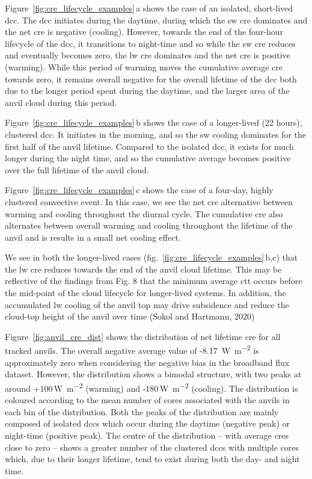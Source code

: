 Figure~\ref{fig:cre_lifecycle_examples}\,a shows the case of an isolated, short-lived \acrshort{dcc}. The \acrshort{dcc}
initiates during the daytime, during which the \acrshort{sw} \acrshort{cre} dominates and the
net \acrshort{cre} is negative (cooling). However, towards the end of the four-hour
lifecycle of the \acrshort{dcc}, it transitions to night-time and so while the \acrshort{sw}
\acrshort{cre} reduces and eventually becomes zero, the \acrshort{lw} \acrshort{cre} dominates and the
net \acrshort{cre} is positive (warming). While this period of warming moves the
cumulative average \acrshort{cre} towards zero, it remains overall negative for the
overall lifetime of the \acrshort{dcc} both due to the longer period spent during
the daytime, and the larger area of the anvil cloud during this period.

Figure~\ref{fig:cre_lifecycle_examples}\,b shows the case of a longer-lived (22 hours), clustered \acrshort{dcc}.
It initiates in the morning, and so the \acrshort{sw} cooling dominates for the
first half of the anvil lifetime. Compared to the isolated \acrshort{dcc}, it
exists for much longer during the night time, and so the cumulative
average becomes positive over the full lifetime of the anvil cloud.

Figure~\ref{fig:cre_lifecycle_examples}\,c shows the case of a four-day, highly clustered convective
event. In this case, we see the net \acrshort{cre} alternative between warming and
cooling throughout the diurnal cycle. The cumulative \acrshort{cre} also alternates
between overall warming and cooling throughout the lifetime of the anvil
and is results in a small net cooling effect.

We see in both the longer-lived cases (fig.~\ref{fig:cre_lifecycle_examples}\,b,c) that the \acrshort{lw}
\acrshort{cre} reduces towards the end of the anvil cloud lifetime. This may be
reflective of the findings from Fig. 8 that the minimum average \acrshort{ctt}
occurs before the mid-point of the cloud lifecycle for longer-lived
systems. In addition, the accumulated \acrshort{lw} cooling of the anvil top may
drive subsidence and reduce the cloud-top height of the anvil over time
(Sokol and Hartmann, 2020)

Figure~\ref{fig:anvil_cre_dist} shows the distribution of net lifetime \acrshort{cre} for all tracked
anvils. The overall negative average value of -8.17
\,\unit{W m^{-2}} is approximately zero when considering the
negative bias in the broadband flux dataset. However, the distribution
shows a bimodal structure, with two peaks at around
+100\,\unit{W m^{-2}} (warming) and -180\,\unit{W m^{-2}}
(cooling). The distribution is coloured according to the mean number of
cores associated with the anvils in each bin of the distribution. Both
the peaks of the distribution are mainly composed of isolated \acrshort{dcc}s which
occur during the daytime (negative peak) or night-time (positive peak).
The centre of the distribution -- with average \acrshort{cre}s close to zero --
shows a greater number of the clustered \acrshort{dcc}s with multiple cores which,
due to their longer lifetime, tend to exist during both the day- and
night time.


